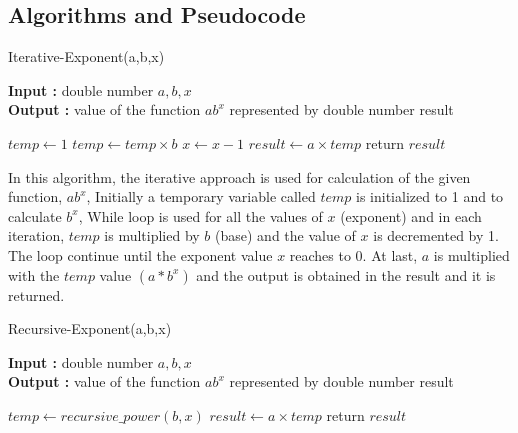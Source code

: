 \documentclass[12pt, a4paper]{article}
\begin{document}
\subsection{Algorithms and Pseudocode}
\begin{algorithm}[hbt!]
\caption{Iterative-Exponent(a,b,x)}\label{alg:one}

\hspace*{\algorithmicindent} \textbf{Input : }double number $a,b,x$ \\
\hspace*{\algorithmicindent} \textbf{Output : }value of the function $ab^x$ represented by double number result
\begin{algorithmic}[1]
\STATE $temp \gets 1$
  \STATE $temp \gets temp \times b$
  \STATE $x \gets x - 1$
\ENDWHILE
\STATE $result \gets a \times temp$
\STATE return $result$
\end{algorithmic}
\end{algorithm}

In this algorithm, the iterative approach is used for calculation of the given function, $ab^x$, Initially a temporary  variable called $temp$ is initialized to 1 and to calculate $b^x$, While loop is used for all the values of $x$ (exponent) and in each iteration, $temp$ is multiplied by $b$ (base) and the value of $x$ is decremented by 1. The loop continue until the exponent value $x$ reaches to 0. At last, $a$ is multiplied with the $temp$ value $(a*b^x)$ and the output is obtained in the result and it is returned.

\vspace{40mm}


\begin{algorithm}[hbt!]
\caption{Recursive-Exponent(a,b,x)}\label{alg:two}

\hspace*{\algorithmicindent} \textbf{Input : }double number $a,b,x$ \\
\hspace*{\algorithmicindent} \textbf{Output : }value of the function $ab^x$ represented by double number result
\begin{algorithmic}[1]
\STATE $temp \gets recursive\_power(b,x)$
\STATE $result \gets a \times temp$
\STATE return $result$
\end{algorithmic}
\end{algorithm}

\newpage
\end{document}
